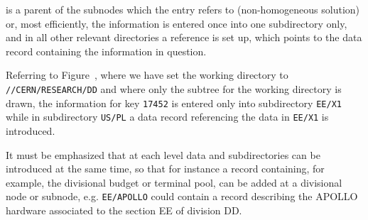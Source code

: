 is a parent of the subnodes which the entry refers to (non-homogeneous
solution) or, most efficiently, the information is entered once into
one subdirectory only, and in all other relevant directories a
reference is set up, which points to the data record containing
the information in question.
\begin{figure}\label{RZFIG03 FRAME=RULE PLACE=INLINE>
\caption{The layout of the DD subdirectory}
\end{figure}
\par Referring to Figure~\pageref{RZFIG03}, where we have set the working
directory to {\tt //CERN/RESEARCH/DD}
and where only the subtree for the working directory is drawn,
the information for key {\tt 17452}
is entered only into subdirectory {\tt EE/X1}
while in subdirectory {\tt US/PL}
a data record referencing the data in {\tt EE/X1}
is introduced.
\par It must be emphasized that at each level data
and subdirectories can be introduced at the same time, so that for
instance a record containing, for example,
the divisional budget or terminal pool, can be added at a divisional
node or subnode, e.g. {\tt EE/APOLLO}
could contain a record describing the APOLLO hardware associated to
the section EE of division DD.
